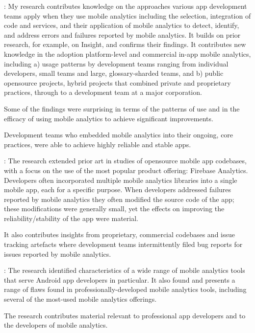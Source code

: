 : 
My research contributes knowledge on the approaches various app development teams apply when they use mobile analytics including the selection, integration of code and services, and their application of mobile analytics to detect, identify, and address errors and failures reported by mobile analytics. It builds on prior research, for example, on Insight, and confirms their findings. It contributes new knowledge in the adoption platform-level and commercial in-app mobile analytics, including a) usage patterns by development teams ranging from individual  developers, small teams and large,  \gls{glossary-sharded} teams, and b) public opensource projects, hybrid projects that combined private and proprietary practices, through to a development team at a major corporation.

Some of the findings were surprising in terms of the patterns of use and in the efficacy of using mobile analytics to achieve significant improvements.

Development teams who embedded mobile analytics into their ongoing, core practices, were able to achieve highly reliable and stable apps. 

: 
The research extended prior art in studies of opensource mobile app codebases, with a focus on the use of the most popular product offering: Firebase Analytics. Developers often incorporated multiple mobile analytics libraries into a single mobile app, each for a specific purpose. When developers addressed failures reported by mobile analytics they often modified the source code of the app; these modifications were generally small, yet the effects on improving the reliability/stability of the app were material. 

It also contributes insights from proprietary, commercial codebases and issue tracking artefacts where development teams intermittently filed bug reports for issues reported by mobile analytics.

:
The research identified characteristics of a wide range of mobile analytics tools that serve Android app developers in particular. It also found and  presents a range of flaws found in professionally-developed mobile analytics tools, including several of the most-used mobile analytics offerings.

The research contributes material relevant to professional app developers and to the developers of mobile analytics. 

